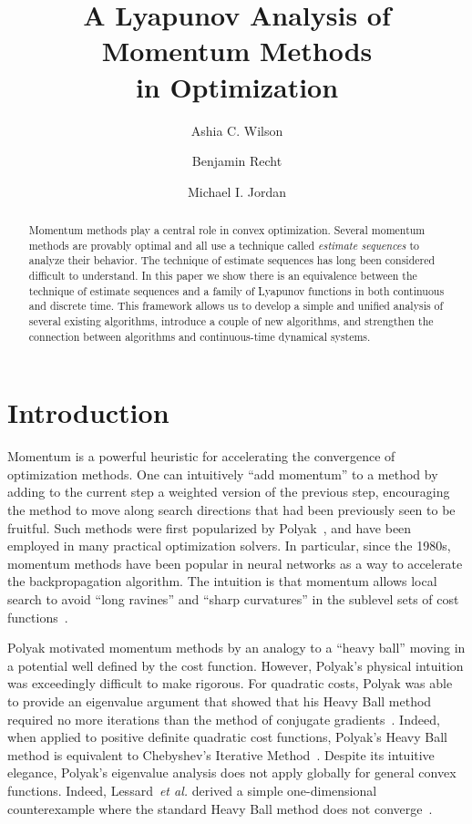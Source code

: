 \documentclass[11pt]{article}
\theoremstyle{plain}
\begin{document}
\title{A Lyapunov Analysis of Momentum Methods \\ in  Optimization}
\date{}
\author{Ashia C. Wilson \and Benjamin Recht \and Michael I. Jordan}
\maketitle
\begin{abstract}
Momentum methods play a central role in convex optimization. Several momentum methods are provably optimal and all use a technique called {\em estimate sequences} to analyze their behavior.  The technique of estimate sequences has long been considered difficult to understand. In this paper we show there is an equivalence between the technique of estimate sequences and a family of Lyapunov functions in both continuous and discrete time. This framework allows us to develop a simple and unified analysis of several existing algorithms, introduce a couple of new algorithms, and strengthen the connection between algorithms and continuous-time dynamical systems. 
\end{abstract}

\section{Introduction}

Momentum is a powerful heuristic for accelerating the convergence of optimization methods.    One can intuitively ``add momentum'' to a method by adding to the current step a weighted version of the previous step, encouraging the method to move along search directions that had been previously seen to be fruitful.  Such methods were first popularized by Polyak~\cite{Polyak1964}, and have been employed in many practical optimization solvers.  In particular, since the 1980s, momentum methods have been popular in neural networks as a way to accelerate the backpropagation algorithm.  The intuition is that momentum allows local search to avoid ``long ravines'' and ``sharp curvatures'' in the sublevel sets of cost functions~\cite{Rumelhardt}.

Polyak motivated momentum methods by an analogy to a ``heavy ball'' moving in a potential well defined by the cost function.  However, Polyak's physical intuition was exceedingly difficult to make rigorous.  For quadratic costs, Polyak was able to provide an eigenvalue argument that showed that his Heavy Ball method required no more iterations than the method of conjugate gradients~\cite{Polyak1964}.  
Indeed, when applied to positive definite quadratic cost functions, Polyak's Heavy Ball method is equivalent to Chebyshev's Iterative Method~\cite{Chebyshev}.   Despite its intuitive elegance, Polyak's eigenvalue analysis does not apply globally for general convex functions. Indeed, Lessard~\emph{et al.} derived a simple one-dimensional counterexample where the standard Heavy Ball method does not converge~\cite{Lessard14}.  
\end{document}
